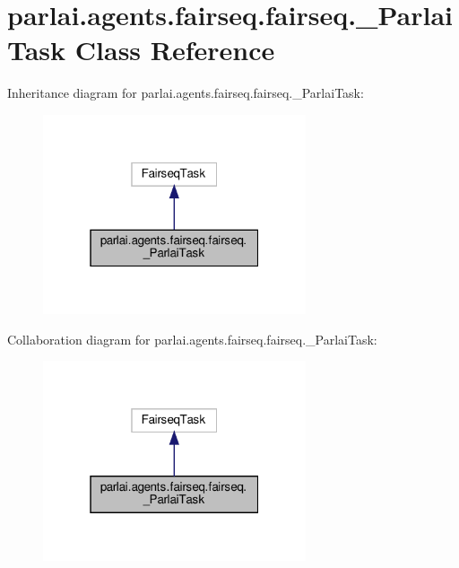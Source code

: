 \hypertarget{classparlai_1_1agents_1_1fairseq_1_1fairseq_1_1__ParlaiTask}{}\section{parlai.\+agents.\+fairseq.\+fairseq.\+\_\+\+Parlai\+Task Class Reference}
\label{classparlai_1_1agents_1_1fairseq_1_1fairseq_1_1__ParlaiTask}


Inheritance diagram for parlai.\+agents.\+fairseq.\+fairseq.\+\_\+\+Parlai\+Task\+:
\nopagebreak
\begin{figure}[H]
\begin{center}
\leavevmode
\includegraphics[width=220pt]{classparlai_1_1agents_1_1fairseq_1_1fairseq_1_1__ParlaiTask__inherit__graph}
\end{center}
\end{figure}


Collaboration diagram for parlai.\+agents.\+fairseq.\+fairseq.\+\_\+\+Parlai\+Task\+:
\nopagebreak
\begin{figure}[H]
\begin{center}
\leavevmode
\includegraphics[width=220pt]{classparlai_1_1agents_1_1fairseq_1_1fairseq_1_1__ParlaiTask__coll__graph}
\end{center}
\end{figure}
